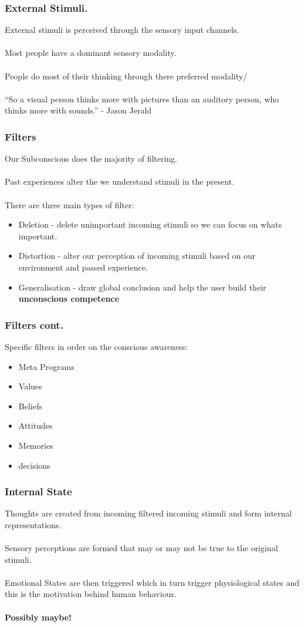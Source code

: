 \begin{frame}
	\frametitle{External Stimuli. }
	External stimuli is perceived through the sensory input channels. \\~\\ 
	Most people have a dominant sensory modality. \\~\\
	People do most of their thinking through there preferred modality/ \\~\\
	``So a visual person thinks more with pictures than an auditory person, who thinks more with sounds.'' - Jason Jerald
	 
\end{frame}

\begin{frame}
	\frametitle{Filters}
	Our Subconscious does the majority of filtering. \\~\\
	Past experiences alter the we understand stimuli in the present. \\~\\
	There are three main types of filter: 
	\begin{itemize}
		\item	Deletion - delete unimportant incoming stimuli so we can focus on whats important.
		\item Distortion - alter our perception of incoming stimuli based on our environment and passed experience. 
		\item Generalisation - draw global conclusion and help the user build their \textbf{unconscious competence}
	\end{itemize}

\end{frame}

\begin{frame}
	\frametitle{Filters cont. }
	Specific filters in order on the conscious awareness:
	
	\begin{itemize}
		\item Meta Programs
		\item Values
		\item Beliefs
		\item Attitudes
		\item Memories
		\item decisions 
	\end{itemize}
\end{frame}

\begin{frame}
	\frametitle{Internal State}
	Thoughts are created from incoming filtered incoming stimuli and form internal representations. \\~\\
	Sensory perceptions are formed that may or may not be true to the original stimuli. \\~\\
	Emotional States are then triggered which in turn trigger physiological states and this is the motivation behind human behaviour. \\~\\
	\textbf{Possibly maybe!}
\end{frame}

